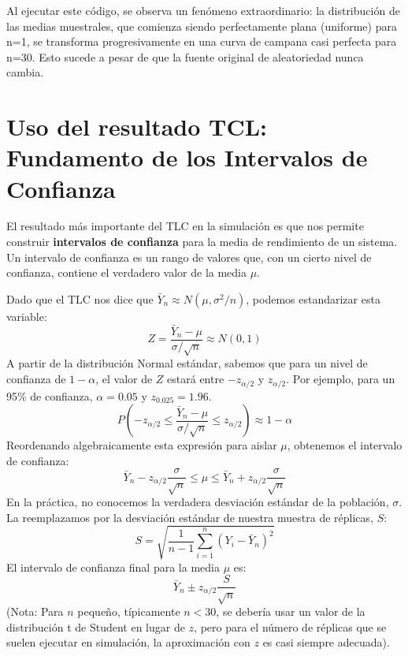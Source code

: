 \documentclass[11pt, letterpaper]{article}
\begin{document}
Al ejecutar este código, se observa un fenómeno extraordinario: la distribución de las medias muestrales, que comienza siendo perfectamente plana (uniforme) para n=1, se transforma progresivamente en una curva de campana casi perfecta para n=30. Esto sucede a pesar de que la fuente original de aleatoriedad nunca cambia.


\section{Uso del resultado TCL: Fundamento de los Intervalos de Confianza}
El resultado más importante del TLC en la simulación es que nos permite construir \textbf{intervalos de confianza} para la media de rendimiento de un sistema. Un intervalo de confianza es un rango de valores que, con un cierto nivel de confianza, contiene el verdadero valor de la media $\mu$.

Dado que el TLC nos dice que $\bar{Y}_n \approx N(\mu, \sigma^2/n)$, podemos estandarizar esta variable:
\[
Z = \frac{\bar{Y}_n - \mu}{\sigma / \sqrt{n}} \approx N(0, 1)
\]
A partir de la distribución Normal estándar, sabemos que para un nivel de confianza de $1-\alpha$, el valor de $Z$ estará entre $-z_{\alpha/2}$ y $z_{\alpha/2}$. Por ejemplo, para un 95\% de confianza, $\alpha=0.05$ y $z_{0.025} = 1.96$.
\[
P\left(-z_{\alpha/2} \le \frac{\bar{Y}_n - \mu}{\sigma / \sqrt{n}} \le z_{\alpha/2}\right) \approx 1-\alpha
\]
Reordenando algebraicamente esta expresión para aislar $\mu$, obtenemos el intervalo de confianza:
\[
\bar{Y}_n - z_{\alpha/2} \frac{\sigma}{\sqrt{n}} \le \mu \le \bar{Y}_n + z_{\alpha/2} \frac{\sigma}{\sqrt{n}}
\]
En la práctica, no conocemos la verdadera desviación estándar de la población, $\sigma$. La reemplazamos por la desviación estándar de nuestra muestra de réplicas, $S$:
\[
S = \sqrt{\frac{1}{n-1}\sum_{i=1}^{n} (Y_i - \bar{Y}_n)^2}
\]
El intervalo de confianza final para la media $\mu$ es:
\begin{equation}
\bar{Y}_n \pm z_{\alpha/2} \frac{S}{\sqrt{n}}
\end{equation}
(Nota: Para $n$ pequeño, típicamente $n < 30$, se debería usar un valor de la distribución t de Student en lugar de $z$, pero para el número de réplicas que se suelen ejecutar en simulación, la aproximación con $z$ es casi siempre adecuada).
\end{document}

